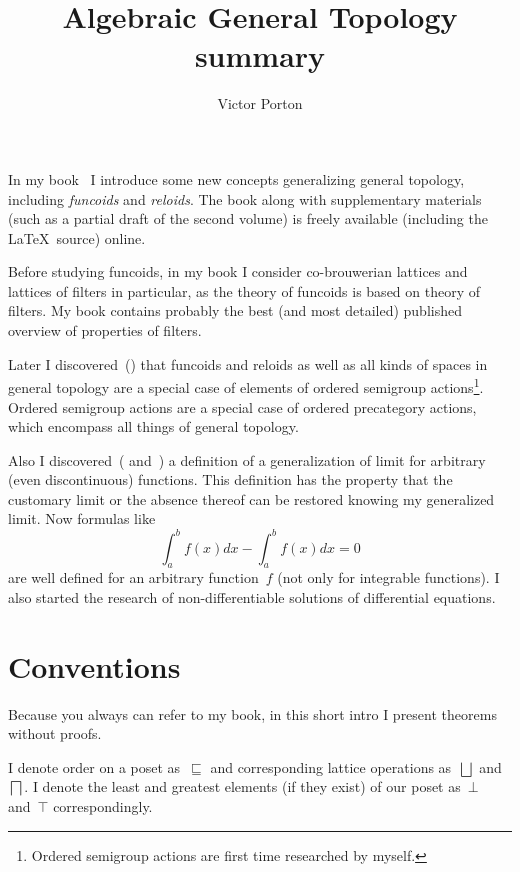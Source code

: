 \documentclass{amsart}
\begin{document}
\author{Victor Porton}

\title[Algebraic General Topology]{Algebraic General Topology summary}

\maketitle

In my book~\cite{volume-1-edition1} I introduce some new concepts
generalizing general topology, including \emph{funcoids} and \emph{reloids}.
The book along with supplementary materials (such as a partial draft of the second volume)
is freely available (including the \LaTeX\ source) online.

Before studying funcoids, in my book I consider
co-brouwerian lattices and lattices of filters in particular,
as the theory of funcoids is based on theory of filters.
My book contains probably the best (and most detailed) published overview of properties of filters.

Later I discovered~(\cite{volume-3}) that funcoids and reloids as well as all
kinds of spaces in general topology are a special case of
elements of ordered semigroup actions\footnote{Ordered semigroup actions are first time researched by myself.}. Ordered semigroup actions are a special case of ordered precategory actions, which encompass all things of general topology.

Also I discovered~(\cite{volume-1-edition1} and~\cite{limit}) a definition of a generalization of limit for arbitrary (even discontinuous) functions. This definition has the property that the customary limit or the absence thereof can be restored knowing my generalized limit. Now formulas like \[ \int_a^b f(x)dx - \int_a^b f(x)dx = 0 \] are well defined for an arbitrary function~$f$ (not only for integrable functions). I also started the research of non-differentiable solutions of differential equations.

\section{Conventions}

Because you always can refer to my book, in this short intro I present theorems without proofs.

I denote order on a poset as~$\sqsubseteq$ and corresponding lattice operations as~$\bigsqcup$ and~$\bigsqcap$.
I denote the least and greatest elements (if they exist) of our poset as~$\bot$ and~$\top$ correspondingly.
\end{document}
